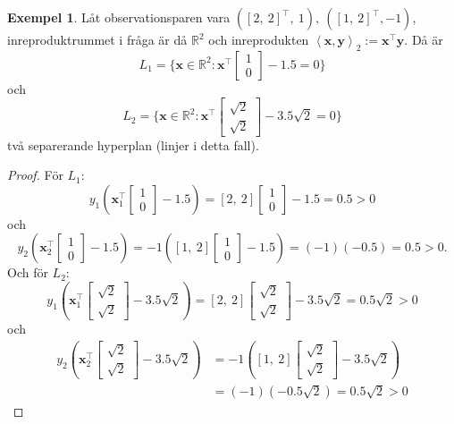 \documentclass[a4paper, 12pt]{report}
\theoremstyle{definition}
\newtheorem{ex}{Exempel}[section]
\theoremstyle{remark}
\newcommand{\bfx}{\mathbf{x}}
\newcommand{\llangle}{\left\langle}
\newcommand{\rrangle}{\right\rangle}
\newcommand{\inner}[2]{\llangle #1, #2 \rrangle}
\begin{document}
\begin{ex}\label{exempel:mångahyperplan}
	Låt observationsparen vara $\left(\left[2,~2\right]^\intercal,~1\right),~\left(\left[1,~2\right]^\intercal,-1\right)$, inreproduktrummet i fråga är då $\mathbb{R}^2$ och inreprodukten $\inner{\bfx}{\mathbf{y}}_2:=\bfx^\intercal\mathbf{y}$. Då är $$L_1=\{\mathbf{x}\in\mathbb{R}^2: \mathbf{x}^\intercal\begin{bmatrix}
	1\\
	0
	\end{bmatrix} - 1.5=0\}$$ och $$L_2=\{\mathbf{x}\in\mathbb{R}^2: \mathbf{x}^\intercal\begin{bmatrix}
	\sqrt{2}\\
	\sqrt{2}
	\end{bmatrix} - 3.5\sqrt{2}=0\}$$ två separerande hyperplan (linjer i detta fall).
\end{ex}
\begin{proof}
	För $L_1$: $$y_1\left(\mathbf{x}_1^\intercal\begin{bmatrix}
	1\\
	0\end{bmatrix}-1.5\right)=\left[2,~2\right]\begin{bmatrix}
	1\\
	0\end{bmatrix}-1.5=0.5>0$$ och $$y_2\left(\mathbf{x}_2^\intercal\begin{bmatrix}
	1\\
	0\end{bmatrix}-1.5\right)=-1\left(\left[1,~2\right]\begin{bmatrix}
	1\\
	0\end{bmatrix}-1.5\right)=\left(-1\right)\left(-0.5\right)=0.5>0.$$
	Och för $L_2$: $$y_1\left(\mathbf{x}_1^\intercal\begin{bmatrix}
	\sqrt{2}\\
	\sqrt{2}\end{bmatrix}-3.5\sqrt{2}\right)=\left[2,~2\right]\begin{bmatrix}
	\sqrt{2}\\
	\sqrt{2}\end{bmatrix}-3.5\sqrt{2}=0.5\sqrt{2}>0$$ och
	\begin{align*}
	y_2\left(\mathbf{x}_2^\intercal\begin{bmatrix}
	\sqrt{2}\\
	\sqrt{2}\end{bmatrix}-3.5\sqrt{2}\right)&=-1\left(\left[1,~2\right]\begin{bmatrix}
	\sqrt{2}\\
	\sqrt{2}\end{bmatrix}-3.5\sqrt{2}\right)\\
	&=\left(-1\right)\left(-0.5\sqrt{2}\right)=0.5\sqrt{2}>0
	\end{align*}
\end{proof}
\end{document}
